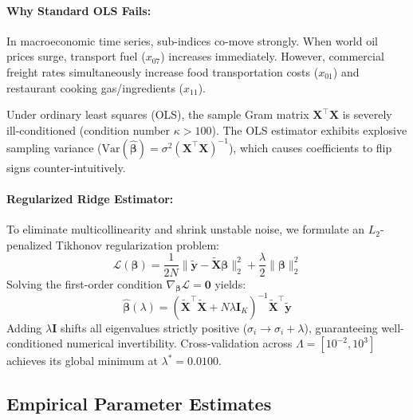 \documentclass[a4paper, 11pt]{article}
\begin{document}
\paragraph{Why Standard OLS Fails:}
In macroeconomic time series, sub-indices co-move strongly. When world oil prices surge, transport fuel ($x_{07}$) increases immediately. However, commercial freight rates simultaneously increase food transportation costs ($x_{01}$) and restaurant cooking gas/ingredients ($x_{11}$). 

Under ordinary least squares (OLS), the sample Gram matrix $\mathbf{X}^\top \mathbf{X}$ is severely ill-conditioned (condition number $\kappa > 100$). The OLS estimator exhibits explosive sampling variance ($\text{Var}(\hat{\boldsymbol{\beta}}) = \sigma^2 (\mathbf{X}^\top \mathbf{X})^{-1}$), which causes coefficients to flip signs counter-intuitively.

\paragraph{Regularized Ridge Estimator:}
To eliminate multicollinearity and shrink unstable noise, we formulate an $L_2$-penalized Tikhonov regularization problem:
\begin{equation}
    \mathcal{L}(\boldsymbol{\beta}) = \frac{1}{2N} \|\tilde{\mathbf{y}} - \tilde{\mathbf{X}} \boldsymbol{\beta}\|_2^2 + \frac{\lambda}{2} \|\boldsymbol{\beta}\|_2^2
\end{equation}
Solving the first-order condition $\nabla_{\boldsymbol{\beta}} \mathcal{L} = \mathbf{0}$ yields:
\begin{equation}
    \boxed{\hat{\boldsymbol{\beta}}(\lambda) = \left( \tilde{\mathbf{X}}^\top \tilde{\mathbf{X}} + N\lambda \mathbf{I}_K \right)^{-1} \tilde{\mathbf{X}}^\top \tilde{\mathbf{y}}}
\end{equation}
Adding $\lambda \mathbf{I}$ shifts all eigenvalues strictly positive ($\sigma_i \to \sigma_i + \lambda$), guaranteeing well-conditioned numerical invertibility. Cross-validation across $\Lambda = [10^{-2}, 10^3]$ achieves its global minimum at \textbf{$\lambda^* = 0.0100$}.

\subsection{Empirical Parameter Estimates}
\end{document}
